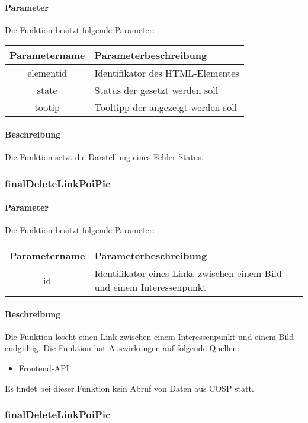 \paragraph{Parameter} Die Funktion besitzt folgende Parameter:
\begin{table}[H]
	\begin{tabular}{|c|p{11cm}|}
		\hline
		\textbf{Parametername} & \textbf{Parameterbeschreibung} \\ \hline
		elementid & Identifikator des HTML-Elementes\\ \hline
		state & Status der gesetzt werden soll\\ \hline
		tootip & Tooltipp der angezeigt werden soll\\ \hline
	\end{tabular}
\end{table}
\paragraph{Beschreibung} Die Funktion setzt die Darstellung eines Fehler-Status.
\subsubsection{finalDeleteLinkPoiPic}
\paragraph{Parameter} Die Funktion besitzt folgende Parameter:
\begin{table}[H]
	\begin{tabular}{|c|p{11cm}|}
		\hline
		\textbf{Parametername} & \textbf{Parameterbeschreibung} \\ \hline
		id & Identifikator eines Links zwischen einem Bild und einem Interessenpunkt \\ \hline
	\end{tabular}
\end{table}
\paragraph{Beschreibung} Die Funktion löscht einen Link zwischen einem Interessenpunkt und einem Bild endgültig. Die Funktion hat Auswirkungen auf folgende Quellen:
\begin{itemize}
	\item Frontend-API
\end{itemize}
Es findet bei dieser Funktion kein Abruf von Daten aus {\glqq COSP\grqq} statt.
\subsubsection{finalDeleteLinkPoiPic}
